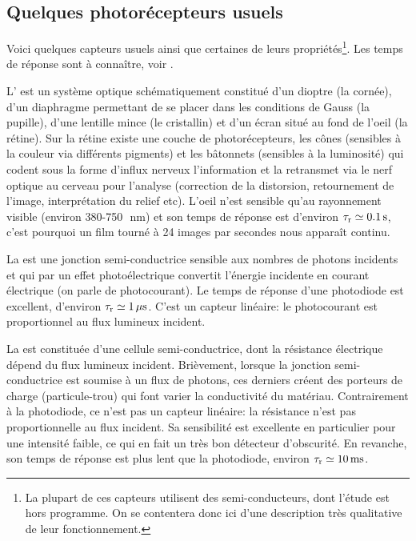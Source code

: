 \documentclass[12pt,fancy]{cours}
\begin{document}
\subsection{Quelques photorécepteurs usuels}
\label{sec:photorec}
Voici quelques capteurs usuels ainsi que certaines de leurs propriétés\footnote{La plupart de ces capteurs utilisent des semi-conducteurs, dont l'étude est hors programme. On se contentera donc ici d'une description très qualitative de leur fonctionnement.}. Les temps de réponse sont à connaître, voir .
\begin{liste}
\item L' est un système optique schématiquement constitué d'un dioptre (la cornée), d'un diaphragme permettant de se placer dans les conditions de Gauss (la pupille), d'une lentille mince (le cristallin) et d'un écran situé au fond de l'oeil (la rétine). Sur la rétine existe une couche de photorécepteurs, les cônes (sensibles à la couleur via différents pigments) et les bâtonnets (sensibles à la luminosité) qui codent sous la forme d'influx nerveux l'information et la retransmet via le nerf optique au cerveau pour l'analyse (correction de la distorsion, retournement de l'image, interprétation du relief etc). L'oeil n'est sensible qu'au rayonnement visible (environ 380-750\,\SI{}{nm}) et son temps de réponse est d'environ $\tau_{\rm r} \simeq \SI{0.1}{s}$, c'est pourquoi un film tourné à 24 images par secondes nous apparaît continu.
\item La  est une jonction semi-conductrice sensible aux nombres de photons incidents et qui par un effet photoélectrique convertit l'énergie incidente en courant électrique (on parle de photocourant). Le temps de réponse d'une photodiode est excellent, d'environ $\tau_{\rm r} \simeq \SI{1}{\mu\second}$. C'est un capteur linéaire: le photocourant est proportionnel au flux lumineux incident.
\item La  est constituée d'une cellule semi-conductrice, dont la résistance électrique dépend du flux lumineux incident. Brièvement, lorsque la jonction semi-conductrice est soumise à un flux de photons, ces derniers créent des porteurs de charge (particule-trou) qui font varier la conductivité du matériau. Contrairement à la photodiode, ce n'est pas un capteur linéaire: la résistance n'est pas proportionnelle au flux incident. Sa sensibilité est excellente en particulier pour une intensité faible, ce qui en fait un très bon détecteur d'obscurité. En revanche, son temps de réponse est plus lent que la photodiode, environ $\tau_{\rm r} \simeq \SI{10}{ms}$.

\end{liste}
\end{document}
